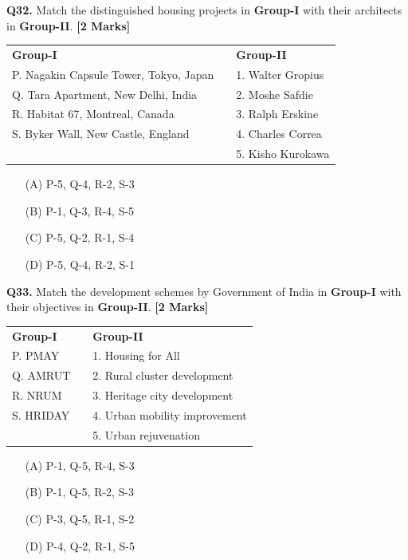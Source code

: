 \documentclass[11pt]{article}
\newcommand{\questionb}[2]{
    \noindent\textbf{Q#2.} #1 \hfill \textbf{[2 Marks]}
}
\begin{document}
\vspace{0.5cm}

\questionb{Match the distinguished housing projects in \textbf{Group-I} with their architects in \textbf{Group-II}.}{32}

\begin{tabularx}{\linewidth}{lXl}
\textbf{Group-I} & & \textbf{Group-II} \\
P. Nagakin Capsule Tower, Tokyo, Japan & & 1. Walter Gropius \\
Q. Tara Apartment, New Delhi, India & & 2. Moshe Safdie \\
R. Habitat 67, Montreal, Canada & & 3. Ralph Erskine \\
S. Byker Wall, New Castle, England & & 4. Charles Correa \\
& & 5. Kisho Kurokawa \\
\end{tabularx}

\begin{enumerate}
    \item[(A)] P-5, Q-4, R-2, S-3
    \item[(B)] P-1, Q-3, R-4, S-5  
    \item[(C)] P-5, Q-2, R-1, S-4
    \item[(D)] P-5, Q-4, R-2, S-1
\end{enumerate}

\vspace{0.5cm}

\questionb{Match the development schemes by Government of India in \textbf{Group-I} with their objectives in \textbf{Group-II}.}{33}

\begin{tabularx}{\linewidth}{lXl}
\textbf{Group-I} & & \textbf{Group-II} \\
P. PMAY & & 1. Housing for All \\
Q. AMRUT & & 2. Rural cluster development \\
R. NRUM & & 3. Heritage city development \\
S. HRIDAY & & 4. Urban mobility improvement \\
& & 5. Urban rejuvenation \\
\end{tabularx}

\begin{enumerate}
    \item[(A)] P-1, Q-5, R-4, S-3
    \item[(B)] P-1, Q-5, R-2, S-3  
    \item[(C)] P-3, Q-5, R-1, S-2
    \item[(D)] P-4, Q-2, R-1, S-5
\end{enumerate}
\end{document}
